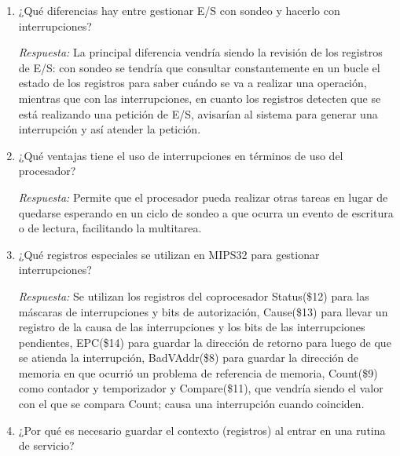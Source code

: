 \documentclass[11pt, a4paper]{article}
\begin{document}
\begin{enumerate}[leftmargin=*, label=\arabic*.]
\begin{center}
{%
    }
    \end{center}

    \item ¿Qué diferencias hay entre gestionar E/S con sondeo y hacerlo con interrupciones?
    
    \vspace{0.2cm}
    \textit{Respuesta:} La principal diferencia vendría siendo la revisión de los registros de E/S: con sondeo se tendría que consultar constantemente en un bucle el estado de los registros para saber cuándo se va a realizar una operación, mientras que con las interrupciones, en cuanto los registros detecten que se está realizando una petición de E/S, avisarían al sistema para generar una interrupción y así atender la petición.
    \vspace{1.5cm}

    \item ¿Qué ventajas tiene el uso de interrupciones en términos de uso del procesador?
    \vspace{0.2cm}

    \textit{Respuesta:} Permite que el procesador pueda realizar otras tareas en lugar de quedarse esperando en un ciclo de sondeo a que ocurra un evento de escritura o de lectura, facilitando la multitarea.
    \vspace{1.5cm}

    \item ¿Qué registros especiales se utilizan en MIPS32 para gestionar interrupciones?
    \vspace{0.2cm}

    \textit{Respuesta:} Se utilizan los registros del coprocesador Status(\$12) para las máscaras de interrupciones y bits de autorización, Cause(\$13) para llevar un registro de la causa de las interrupciones y los bits de las interrupciones pendientes, EPC(\$14) para guardar la dirección de retorno para luego de que se atienda la interrupción, BadVAddr(\$8) para guardar la dirección de memoria en que ocurrió un problema de referencia de memoria, Count(\$9) como contador y temporizador y Compare(\$11), que vendría siendo el valor con el que se compara Count; causa una interrupción cuando coinciden.
    \vspace{1.5cm}

    \item ¿Por qué es necesario guardar el contexto (registros) al entrar en una rutina de servicio?
    

\end{enumerate}
\end{document}
